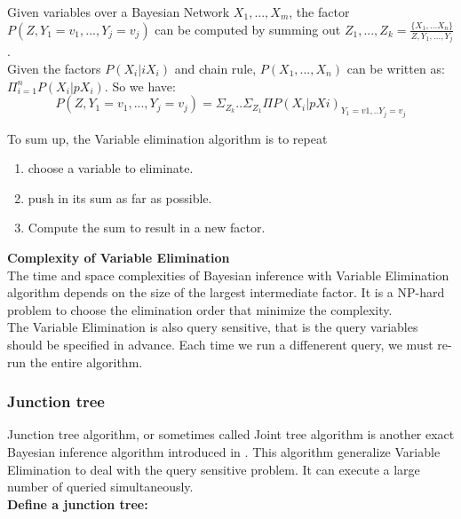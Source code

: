         \noindent Given variables over a Bayesian Network $X_{1}, ... , X_{m}$, the factor $P(Z, Y_{1}=v_{1}, ... , Y_{j}= v_{j})$ can be computed by summing out $Z_{1}, ..., Z_{k} =  \frac{\{X_{1}, ... X_{n}\}}{Z, Y_{1}, ..., Y_{j}}$.\\
        
        \noindent Given the factors $P(X_{i}|iX_{i})$ and chain rule, $P(X_{1}, ..., X_{n})$ can be written as: $\Pi_{i = 1}^{n} P(X_{i}|pX_{i})$. So we have:
        $$P(Z, Y_{1}=v_{1}, ... , Y_{j}= v_{j}) = \Sigma_{Z_{k}}.. \Sigma_{Z_{1}} \Pi P(X_{i}|pX{i})_{Y_{1} = v1, .. Y_{j} = v_{j}}$$
        
       
        \noindent To sum up, the Variable elimination algorithm is to repeat
        \begin{enumerate}
            \item choose a variable to eliminate.
            \item push in its sum as far as possible.
            \item Compute the sum to result in a new factor.
        \end{enumerate}
        \newpage
        \noindent \textbf{Complexity of Variable Elimination}\\
        
        \noindent The time and space complexities of Bayesian inference with Variable Elimination algorithm depends on the size of the largest intermediate factor. It is a NP-hard problem to choose the elimination order that minimize the complexity.\\
        
        \noindent The Variable Elimination is also query sensitive, that is the query variables should be specified in advance. Each time we run a diffenerent query, we must re-run the entire algorithm.
        
        \subsubsection{Junction tree}
        Junction tree algorithm, or sometimes called Joint tree algorithm is another exact Bayesian inference algorithm introduced in \cite{junctree}. This algorithm generalize Variable Elimination to deal with the query sensitive problem. It can execute a large number of queried simultaneously.\\
        
        \noindent \textbf{Define a junction tree:}\\

